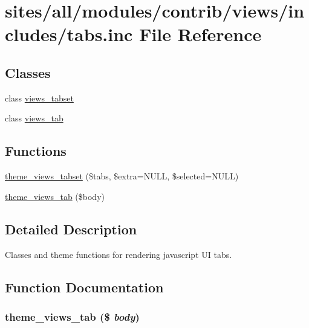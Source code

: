 \hypertarget{tabs_8inc}{
\section{sites/all/modules/contrib/views/includes/tabs.inc File Reference}
\label{tabs_8inc}
}
\subsection*{Classes}
\begin{CompactItemize}
\item 
class \hyperlink{classviews__tabset}{views\_\-tabset}
\item 
class \hyperlink{classviews__tab}{views\_\-tab}
\end{CompactItemize}
\subsection*{Functions}
\begin{CompactItemize}
\item 
\hyperlink{tabs_8inc_205d52e785fc290ec3769378d2ee0ece}{theme\_\-views\_\-tabset} (\$tabs, \$extra=NULL, \$selected=NULL)
\item 
\hyperlink{tabs_8inc_f4e922d338166a9ca8d0e54aa80b7ed6}{theme\_\-views\_\-tab} (\$body)
\end{CompactItemize}


\subsection{Detailed Description}
Classes and theme functions for rendering javascript UI tabs. 

\subsection{Function Documentation}
\hypertarget{tabs_8inc_f4e922d338166a9ca8d0e54aa80b7ed6}{
\subsubsection[{theme\_\-views\_\-tab}]{\setlength{\rightskip}{0pt plus 5cm}theme\_\-views\_\-tab (\$ {\em body})}}
\label{tabs_8inc_f4e922d338166a9ca8d0e54aa80b7ed6}


